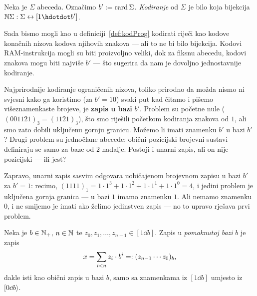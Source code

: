 \begin{definicija}[{name=[kodiranje abecede]}]
Neka je $\Sigma$ abeceda. Označimo $b':=\operatorname{card}\Sigma$. %
\emph{Kodiranje} od $\Sigma$ je bilo koja bijekcija $\N\Sigma:\Sigma\leftrightarrow[1\dd b']$.
\end{definicija}


Sada bismo mogli kao u definiciji~\ref{def:kodProg} kodirati riječi kao kodove konačnih nizova kodova njihovih znakova --- ali to ne bi bilo bijekcija. Kodovi RAM-instrukcija mogli su biti proizvoljno veliki, dok za fiksnu abecedu, kodovi znakova mogu biti najviše $b'$ --- što sugerira da nam je dovoljno jednostavnije kodiranje.

Najprirodnije kodiranje ograničenih nizova, toliko prirodno da možda nismo ni svjesni kako ga koristimo (za $b'=10$) svaki put kad čitamo i pišemo višeznamenkaste brojeve, je \textbf{zapis u bazi} $b'$. Problem su početne nule ($(001121)_3=(1121)_3$), što smo riješili početkom kodiranja znakova od $1$, ali smo zato dobili uključenu gornju granicu. Možemo li imati znamenku $b'$ u bazi $b'$? Drugi problem su jednočlane abecede: obični pozicijski brojevni sustavi definiraju se samo za baze od $2$ nadalje. Postoji i unarni zapis, ali on nije pozicijski --- ili jest?

Zapravo, unarni zapis sasvim odgovara uobičajenom brojevnom zapisu u bazi $b'$ za $b'=1$: recimo, $(1111)_1=1\cdot1^3+1\cdot1^2+1\cdot1^1+1\cdot1^0=4$, i jedini problem je uključena gornja granica --- u bazi $1$ imamo znamenku $1$. Ali nemamo znamenku $0$, i ne smijemo je imati ako želimo jedinstven zapis --- no to upravo rješava prvi problem.

\begin{definicija}[{name=[zapis broja u pomaknutoj bazi]}]
Neka je $b\in{\mathbb N}_+$, $n\in{\mathbb N}$ te $z_0,z_1,\dotsc,z_{n-1}\in[1\dd b]$. Zapis u \emph{pomaknutoj bazi} $b$ je zapis
\begin{equation}\label{eq:pomakbaza}
    x=\sum_{i<n}z_i\cdot b^i=:(z_{n-1}\dotsm z_0)_b\text,
\end{equation}
dakle isti kao obični zapis u bazi $b$, samo sa znamenkama iz $[1\dd b]$ umjesto iz $[0\dd b\rangle$.
\end{definicija}

